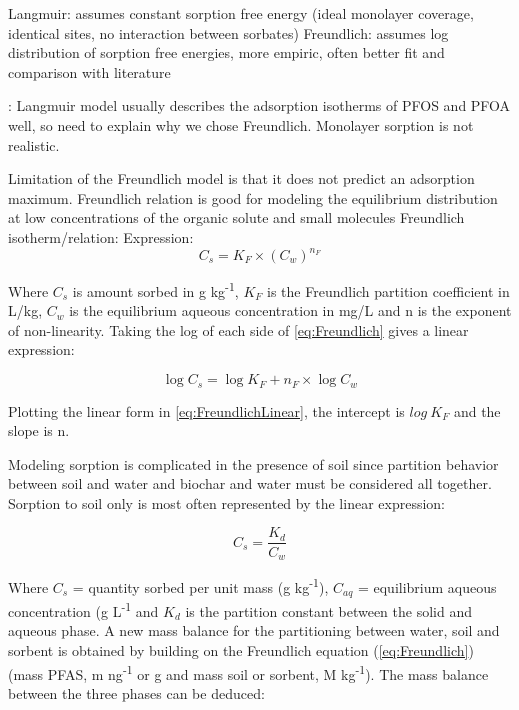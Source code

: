Langmuir: assumes constant sorption free energy (ideal monolayer coverage, identical sites, no interaction between sorbates)
Freundlich: assumes log distribution of sorption free energies, more empiric, often better fit and comparison with literature

\citep{du2014adsorption}: Langmuir model usually describes the adsorption isotherms of PFOS and PFOA well, so need to explain why we chose Freundlich. Monolayer sorption is not realistic. 

Limitation of the Freundlich model is that it does not predict an adsorption maximum. 
Freundlich relation is good for modeling the equilibrium distribution at low concentrations of the organic solute and small molecules \citep{vanloon2017Ch14}
Freundlich isotherm/relation: 
Expression:
\begin{equation} \label{eq:Freundlich}
    C_s = K_F \times (C_{w})^{n_F}
\end{equation}

Where $C_s$ is amount sorbed in \textmu g kg\textsuperscript{-1}, $K_F$ is the Freundlich partition coefficient in L/kg, $C_{w}$ is the equilibrium aqueous concentration in mg/L and n is the exponent of non-linearity. Taking the log of each side of \cref{eq:Freundlich} gives a linear expression:

\begin{equation} \label{eq:FreundlichLinear}
    \log C_s = \log K_F + n_F \times \log C_{w}
\end{equation}

Plotting the linear form in \cref{eq:FreundlichLinear}, the intercept is $log~K_F$ and the slope is n. 

Modeling sorption is complicated in the presence of soil since partition behavior between soil and water and biochar and water must be considered all together. Sorption to soil only is most often represented by the linear expression:

\begin{equation} \label{eq:KD}
    C_s = \frac{K_d}{C_{w}}
\end{equation}

Where $C_s$ = quantity sorbed per unit mass (\textmu g kg\textsuperscript{-1}), $C_{aq}$ =  equilibrium aqueous concentration (\textmu g L\textsuperscript{-1} and $K_d$ is the partition constant between the solid and aqueous phase. A new mass balance for the partitioning between water, soil and sorbent is obtained by building on the Freundlich equation (\cref{eq:Freundlich}) (mass PFAS, m ng\textsuperscript{-1} or \textmu g and mass soil or sorbent, M kg\textsuperscript{-1}). The mass balance between the three phases can be deduced:

